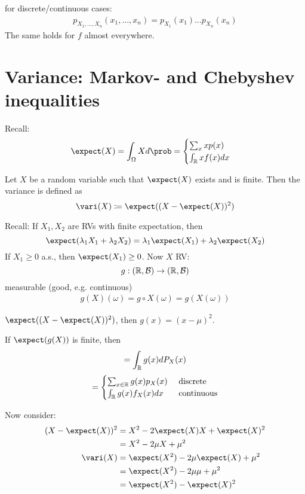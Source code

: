 \documentclass[mfit.tex]{subfiles}
\begin{document}
for discrete/continuous cases:
\begin{align*}
  p_{X_1,\dots,X_n} (x_1,\dots,x_n) = p_{X_1}(x_1) \dots p_{X_n}(x_n)
\end{align*}
The same holds for $f$ almost everywhere.

\section{Variance: Markov- and Chebyshev inequalities}

Recall: 
\begin{align*}
  \expect(X) = \int_\Omega X d\prob = \begin{cases} \sum_x xp(x)\\ \int_\R x f(x) dx \end{cases}
\end{align*}

\begin{defi*}
  Let $X$ be a random variable such that $\expect(X)$ exists and is finite.
  Then the variance is defined as
  \[ \vari(X) \coloneqq \expect((X-\expect(X))^2) \]
\end{defi*}


Recall: If $X_1,X_2$ are RVs with finite expectation, then
\[ \expect( \lambda_1 X_1 + \lambda_2 X_2) = \lambda_1 \expect(X_1) + \lambda_2 \expect(X_2) \]
If $X_1 \geq 0$ a.s., then $\expect(X_1) \geq 0$.
Now $X$ RV:
\[ g: (\mathbb{R},\mathcal{B}) \to (\mathbb{R},\mathcal{B}) \]
measurable (good, e.g. continuous)
\begin{align*}
  g(X) (\omega) = g \circ X(\omega) = g(X(\omega)) 
\end{align*}

\begin{ex}
  $\expect((X-\expect(X))^2)$, then $g(x) = (x - \mu)^2$.
\end{ex}

If $\expect(g(X))$ is finite, then
\[ = \int_{\mathbb{R}} g(x) dP_X(x) \]
\begin{align*}
  = \begin{cases} \sum_{x \in \mathbb{R}} g(x) p_X(x) & \text{ discrete}\\ \int_{\mathbb{R}} g(x) f_X(x) dx & \text{ continuous} \end{cases}
\end{align*}

Now consider:
\begin{align*}
  (X-\expect(X))^2 &= X^2 - 2 \expect(X) X + \expect(X)^2 \\
  &= X^2 - 2 \mu X + \mu^2 \\
  \vari(X) &= \expect(X^2) - 2\mu \expect(X) + \mu^2 \\
  &= \expect(X^2) - 2 \mu \mu + \mu^2 \\
  &= \expect(X^2) - \expect(X)^2
\end{align*}
\end{document}
